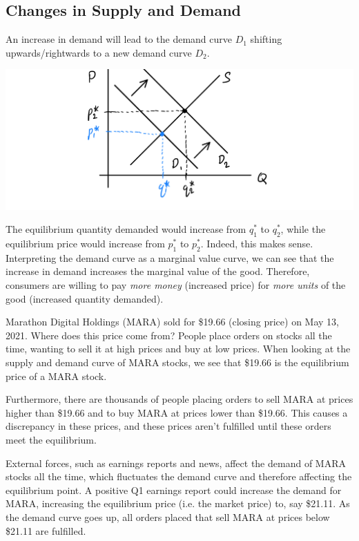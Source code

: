 \documentclass{article}
\begin{document}
  \subsection{Changes in Supply and Demand}

    \begin{definition}
      An increase in demand will lead to the demand curve $D_1$ shifting upwards/rightwards to a new demand curve $D_2$. 
      \begin{center}
        \includegraphics[scale=0.25]{img/Demand_I.PNG}
      \end{center}
      The equilibrium quantity demanded would increase from $q_1^*$ to $q_2^*$, while the equilibrium price would increase from $p_1^*$ to $p_2^*$. Indeed, this makes sense. Interpreting the demand curve as a marginal value curve, we can see that the increase in demand increases the marginal value of the good. Therefore, consumers are willing to pay \textit{more money} (increased price) for \textit{more units} of the good (increased quantity demanded). 
    \end{definition}

    \begin{example}[Stocks]
      Marathon Digital Holdings (MARA) sold for \$19.66 (closing price) on May 13, 2021. Where does this price come from? People place orders on stocks all the time, wanting to sell it at high prices and buy at low prices. When looking at the supply and demand curve of MARA stocks, we see that \$19.66 is the equilibrium price of a MARA stock. 

      Furthermore, there are thousands of people placing orders to sell MARA at prices higher than \$19.66 and to buy MARA at prices lower than \$19.66. This causes a discrepancy in these prices, and these prices aren't fulfilled until these orders meet the equilibrium. 

      External forces, such as earnings reports and news, affect the demand of MARA stocks all the time, which fluctuates the demand curve and therefore affecting the equilibrium point. A positive Q1 earnings report could increase the demand for MARA, increasing the equilibrium price (i.e. the market price) to, say \$21.11. As the demand curve goes up, all orders placed that sell MARA at prices below \$21.11 are fulfilled. 
    \end{example}
\end{document}
